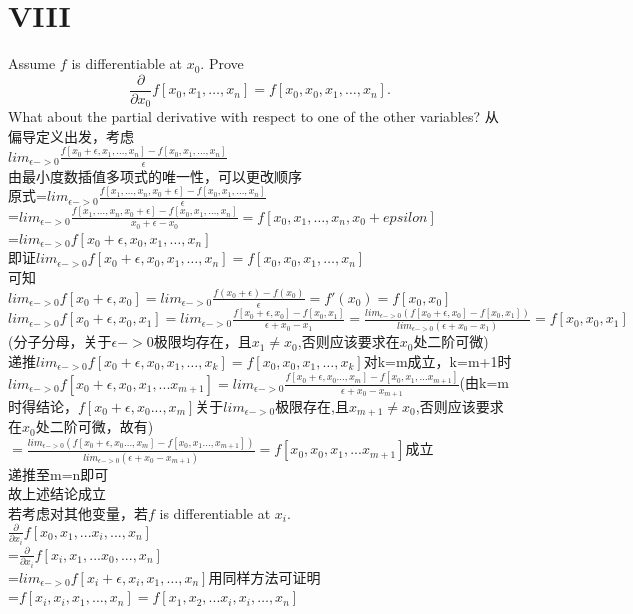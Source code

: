 \documentclass[a4paper]{article}
\begin{document}
\section*{VIII}
Assume \( f \) is differentiable at \( x_0 \). Prove
\[
\frac{\partial}{\partial x_0} f[x_0, x_1, \ldots, x_n] = f[x_0, x_0, x_1, \ldots, x_n].
\]
What about the partial derivative with respect to one of the other variables?
从偏导定义出发，考虑\\
$lim_{\epsilon->0}\frac{f[x_0+\epsilon, x_1, \ldots, x_n] - f[x_0,x_1, \ldots, x_n]}{\epsilon}$\\
由最小度数插值多项式的唯一性，可以更改顺序\\
原式=$lim_{\epsilon->0}\frac{f[x_1, \ldots, x_n,x_0+\epsilon] - f[x_0,x_1, \ldots, x_n]}{\epsilon}$\\
=$lim_{\epsilon->0}\frac{f[x_1, \ldots, x_n,x_0+\epsilon] - f[x_0,x_1, \ldots, x_n]}{x_0+\epsilon-x_0}=f[x_0, x_1, \ldots, x_n,x_0+epsilon]$\\
=$lim_{\epsilon->0}f[x_0+\epsilon,x_0, x_1, \ldots, x_n]$\\
即证$lim_{\epsilon->0}f[x_0+\epsilon,x_0, x_1, \ldots, x_n]=f[x_0,x_0, x_1, \ldots, x_n]$\\
可知\\
$lim_{\epsilon->0}f[x_0+\epsilon,x_0]=lim_{\epsilon->0}\frac{f(x_0+\epsilon)-f(x_0)}{\epsilon}=f'(x_0)=f[x_0,x_0]$\\
$lim_{\epsilon->0}f[x_0+\epsilon,x_0,x_1]=lim_{\epsilon->0}\frac{f[x_0+\epsilon,x_0]-f[x_0,x_1]}{\epsilon+x_0-x_1}=\frac{lim_{\epsilon->0}(f[x_0+\epsilon,x_0]-f[x_0,x_1])}{lim_{\epsilon->0}(\epsilon+x_0-x_1)}=f[x_0,x_0,x_1]$(分子分母，关于$\epsilon->0$极限均存在，且$x_1\neq x_0$,否则应该要求在$x_0$处二阶可微)\\
递推$lim_{\epsilon->0}f[x_0+\epsilon,x_0, x_1, \ldots, x_k]=f[x_0,x_0, x_1, \ldots, x_k]$对k=m成立，k=m+1时\\
$lim_{\epsilon->0}f[x_0+\epsilon,x_0,x_1,...x_{m+1}]=lim_{\epsilon->0}\frac{f[x_0+\epsilon,x_0...,x_m]-f[x_0,x_1,...x_{m+1}]}{\epsilon+x_0-x_{m+1}}$(由k=m时得结论，$f[x_0+\epsilon,x_0...,x_m]$关于$lim_{\epsilon->0}$极限存在,且$x_{m+1}\neq x_0$,否则应该要求在$x_0$处二阶可微，故有)\\
$=\frac{lim_{\epsilon->0}(f[x_0+\epsilon,x_0...,x_m]-f[x_0,x_1...,x_{m+1}])}{lim_{\epsilon->0}(\epsilon+x_0-x_{m+1})}=f[x_0,x_0,x_1,...x_{m+1}]$成立\\
递推至m=n即可\\
故上述结论成立\\
若考虑对其他变量，若\( f \) is differentiable at \( x_i \). \\
$\frac{\partial}{\partial x_i} f[x_0, x_1,...x_i,..., x_n]$\\
=$\frac{\partial}{\partial x_i} f[x_i, x_1,...x_0,..., x_n]$\\
=$lim_{\epsilon->0}f[x_i+\epsilon,x_i, x_1, \ldots, x_n]$用同样方法可证明\\
=$f[x_i,x_i, x_1, \ldots, x_n]=f[x_1,x_2,... x_i,x_i, \ldots, x_n]$\\
\end{document}
